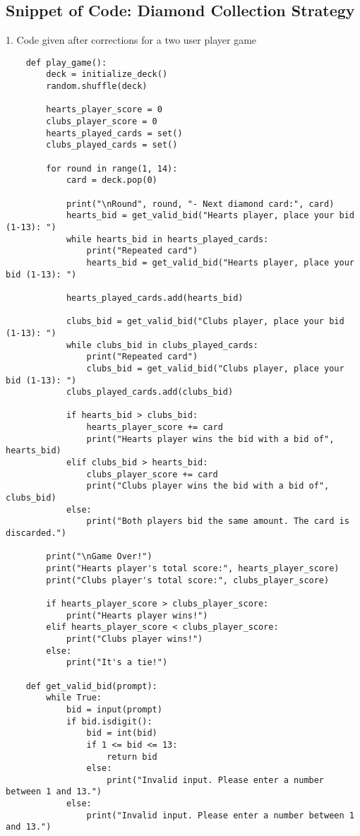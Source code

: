 \documentclass{article}
\begin{document}
\subsection{Snippet of Code: Diamond Collection Strategy}

1. Code given after corrections for a two user player game 

\begin{lstlisting}
    def play_game():
        deck = initialize_deck()
        random.shuffle(deck)
    
        hearts_player_score = 0
        clubs_player_score = 0
        hearts_played_cards = set()
        clubs_played_cards = set()
    
        for round in range(1, 14):
            card = deck.pop(0)
    
            print("\nRound", round, "- Next diamond card:", card)
            hearts_bid = get_valid_bid("Hearts player, place your bid (1-13): ")
            while hearts_bid in hearts_played_cards:
                print("Repeated card")
                hearts_bid = get_valid_bid("Hearts player, place your bid (1-13): ")
                
            hearts_played_cards.add(hearts_bid)
    
            clubs_bid = get_valid_bid("Clubs player, place your bid (1-13): ")
            while clubs_bid in clubs_played_cards:
                print("Repeated card")
                clubs_bid = get_valid_bid("Clubs player, place your bid (1-13): ")
            clubs_played_cards.add(clubs_bid)
    
            if hearts_bid > clubs_bid:
                hearts_player_score += card
                print("Hearts player wins the bid with a bid of", hearts_bid)
            elif clubs_bid > hearts_bid:
                clubs_player_score += card
                print("Clubs player wins the bid with a bid of", clubs_bid)
            else:
                print("Both players bid the same amount. The card is discarded.")
    
        print("\nGame Over!")
        print("Hearts player's total score:", hearts_player_score)
        print("Clubs player's total score:", clubs_player_score)
    
        if hearts_player_score > clubs_player_score:
            print("Hearts player wins!")
        elif hearts_player_score < clubs_player_score:
            print("Clubs player wins!")
        else:
            print("It's a tie!")
    
    def get_valid_bid(prompt):
        while True:
            bid = input(prompt)
            if bid.isdigit():
                bid = int(bid)
                if 1 <= bid <= 13:
                    return bid
                else:
                    print("Invalid input. Please enter a number between 1 and 13.")
            else:
                print("Invalid input. Please enter a number between 1 and 13.")
    
    
\end{lstlisting}
\end{document}
